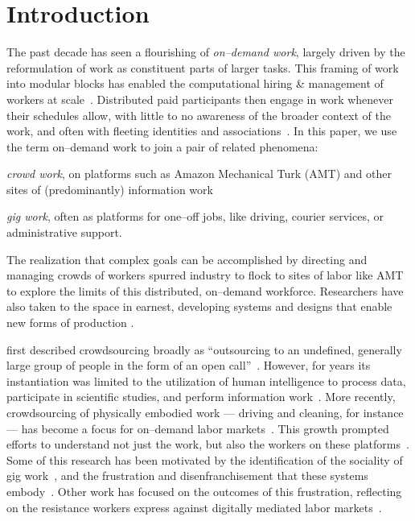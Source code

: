 \documentclass[trackingWork]{subfiles}
\begin{document}
\section{Introduction}\label{sec:introduction}
{The past decade has seen a flourishing of \textit{on--demand work},
largely driven by the reformulation of work as
constituent parts of larger tasks.}
This framing of work into modular blocks
has enabled the computational hiring \& management of workers at scale~\cite{howe2008crowdsourcing,Bigham2014,crowdworkFuture}.
Distributed paid participants then engage in work whenever their schedules allow,
with little to no awareness of the broader context of the work, and
often with fleeting identities and associations~\cite{martin2014being,uberAlgorithm}.
In this paper, we use the term on--demand work to join a pair of related phenomena:
\begin{numberlist}[itemjoin*={;~and~},itemjoin={;~}]
\item \textit{crowd work}, on platforms such as Amazon Mechanical Turk (AMT) and other sites of (predominantly) information work
\item \textit{gig work}, often as platforms for one--off jobs, like driving, courier services, or administrative support.
\end{numberlist}
The realization that complex goals can be accomplished by directing and managing crowds of workers spurred industry to flock to sites of labor
like AMT to explore the limits of this distributed, on--demand workforce.
Researchers have also taken to the space in earnest,
developing systems and designs that enable new forms of production
\cite[e.g.][]{bernsteinSoylent,vizwiz,paolacci2010running}.

\citeauthor{howe2008crowdsourcing} first described crowdsourcing broadly as
``outsourcing to an undefined, generally large group of people in the form of an open call''~\cite{howe2008crowdsourcing}.
However, for years its instantiation was limited to the utilization of
human intelligence to process data, participate in scientific studies, and perform information work~\cite{CrowdsourcingUserStudies,movieSummarizationWu,yuenSurvey,geiger2011managing,quinnbedersonTaxonomy}.
More recently, crowdsourcing of physically embodied work
--- driving and cleaning, for instance ---
has become a focus for on--demand labor markets~\cite{uberAlgorithm,uberOfficial,zaarlyOfficial,taskrabbitOfficial}.
This growth prompted efforts to understand not just the work, but also the workers on these platforms~\cite{Ross,whoareNOTtheTurkers}.
Some of this research has been motivated by the identification of the sociality of gig work~\cite{crowdcollab},
and the frustration and disenfranchisement that these systems embody~\cite{turkopticon,martin2014being,takingAHITMcInnis}.
Other work has focused on the outcomes of this frustration,
reflecting on the resistance workers express against digitally mediated labor markets~\cite{uberAlgorithm,dynamo}.
\end{document}
